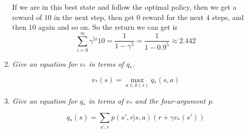 \documentclass[12pt,a4paper]{article}
\begin{document}
\begin{enumerate}
  If we are in this best state and follow the optimal policy, then we get a reward of $10$
  in the next step, then get $0$ reward for the next $4$ steps, and then $10$ again and so on.
  So the return we can get is
  \[\sum\limits_{i = 0}^{\infty} \gamma^{5i} 10 = \frac{1}{1 - \gamma^5} = \frac{1}{1 - 0.9^5} \approx 2.442\]

\item
  \textit{Give an equation for $v_\ast$ in terms of $q_\ast$.}

  \[v_\ast(s) = \max_{a \in \mathbb{A}(s)} q_\ast(s, a)\]

\item
  \textit{Give an equation for $q_\ast$ in terms of $v_\ast$ and the four-argument p.}

  \[q_\ast(s) = \sum\limits_{s', r}p(s', r | s, a) (r + \gamma v_\ast(s'))\]

\end{enumerate}
\end{document}
